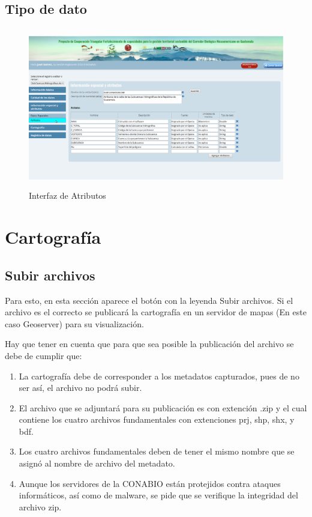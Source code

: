 \documentclass[twoside]{book}
\begin{document}
\subsection{Tipo de dato}

\begin{figure}[h!] %
	\includegraphics[width=12cm, height=7cm]{img/ambienteDeTrabajo} %
	\caption{Interfaz de Atributos}
\end{figure}


\section{Cartografía}
\subsection{Subir archivos}


Para esto, en esta sección aparece el botón con la leyenda Subir archivos. Si el archivo es el correcto se publicará la cartografía en un servidor de mapas (En este caso Geoserver) para su visualización.

Hay que tener en cuenta que para que sea posible la publicación del archivo se debe de cumplir que:
\begin{enumerate}
\item La cartografía debe de corresponder a los metadatos capturados, pues de no ser así, el archivo no podrá subir.

\item El archivo que se adjuntará para su publicación es con extención .zip y el cual contiene los cuatro archivos fundamentales con extenciones prj, shp, shx, y bdf.

\item Los cuatro archivos fundamentales deben de tener el mismo nombre que se asignó al nombre de archivo del metadato.

\item Aunque los servidores de la CONABIO están protejidos contra ataques informáticos, así como de malware, se pide que se verifique la integridad del archivo zip.

\end{enumerate}
\end{document}
